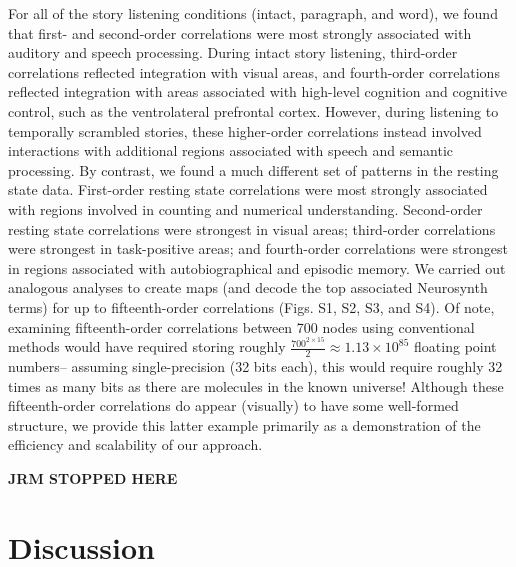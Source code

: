 \documentclass[english]{article}
\begin{document}
For all of the story listening conditions (intact, paragraph, and
word), we found that first- and second-order correlations were most
strongly associated with auditory and speech processing.  During
intact story listening, third-order correlations reflected integration
with visual areas, and fourth-order correlations reflected integration
with areas associated with high-level cognition and cognitive control,
such as the ventrolateral prefrontal cortex.  However, during
listening to temporally scrambled stories, these higher-order
correlations instead involved interactions with additional regions
associated with speech and semantic processing.  By contrast, we found
a much different set of patterns in the resting state data.
First-order resting state correlations were most strongly associated
with regions involved in counting and numerical understanding.
Second-order resting state correlations were strongest in visual
areas; third-order correlations were strongest in task-positive areas;
and fourth-order correlations were strongest in regions associated
with autobiographical and episodic memory.  We carried out analogous
analyses to create maps (and decode the top associated Neurosynth
terms) for up to fifteenth-order correlations (Figs. S1, S2, S3, and
S4).  Of note, examining fifteenth-order correlations between 700
nodes using conventional methods would have required storing roughly
$\frac{700^{2 \times 15}}{2} \approx 1.13 \times 10^{85}$ floating point
numbers-- assuming single-precision (32 bits each), this would require
roughly 32 times as many bits as there are molecules in the known
universe!  Although these fifteenth-order correlations do appear
(visually) to have some well-formed structure, we provide this latter
example primarily as a demonstration of the efficiency and scalability
of our approach.


\textbf{JRM STOPPED HERE}





\section*{Discussion}
\end{document}
